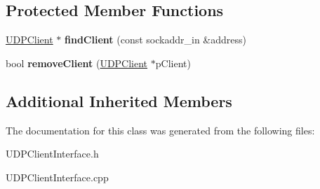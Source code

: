 \subsection*{Protected Member Functions}
\begin{DoxyCompactItemize}
\item 
\mbox{\label{classTBT_1_1UDPClientInterface_aea926878d35ed4b37143e320143a84df}} 
\hyperlink{classTBT_1_1UDPClient}{U\+D\+P\+Client} $\ast$ {\bfseries find\+Client} (const sockaddr\+\_\+in \&address)
\item 
\mbox{\label{classTBT_1_1UDPClientInterface_a1a80ed1e5670443bc35691c9f3d5ff72}} 
bool {\bfseries remove\+Client} (\hyperlink{classTBT_1_1UDPClient}{U\+D\+P\+Client} $\ast$p\+Client)
\end{DoxyCompactItemize}
\subsection*{Additional Inherited Members}


The documentation for this class was generated from the following files\+:\begin{DoxyCompactItemize}
\item 
U\+D\+P\+Client\+Interface.\+h\item 
U\+D\+P\+Client\+Interface.\+cpp\end{DoxyCompactItemize}
